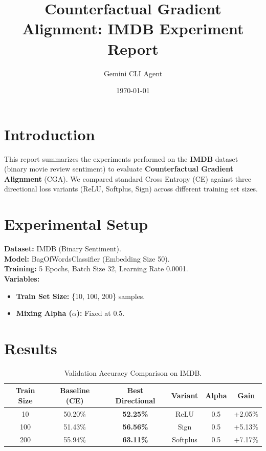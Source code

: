 \documentclass{article}
\title{Counterfactual Gradient Alignment: IMDB Experiment Report}
\author{Gemini CLI Agent}
\date{\today}
\begin{document}
\maketitle

\section{Introduction}
This report summarizes the experiments performed on the \textbf{IMDB} dataset (binary movie review sentiment) to evaluate \textbf{Counterfactual Gradient Alignment} (CGA). We compared standard Cross Entropy (CE) against three directional loss variants (ReLU, Softplus, Sign) across different training set sizes.

\section{Experimental Setup}
\textbf{Dataset:} IMDB (Binary Sentiment). \\
\textbf{Model:} BagOfWordsClassifier (Embedding Size 50). \\
\textbf{Training:} 5 Epochs, Batch Size 32, Learning Rate 0.0001. \\
\textbf{Variables:}
\begin{itemize}
    \item \textbf{Train Set Size:} \{10, 100, 200\} samples.
    \item \textbf{Mixing Alpha ($\alpha$):} Fixed at 0.5.
\end{itemize}

\section{Results}

\begin{table}[h]
\centering
\begin{tabular}{@{}cccccc@{}}
\toprule
\textbf{Train Size} & \textbf{Baseline (CE)} & \textbf{Best Directional} & \textbf{Variant} & \textbf{Alpha} & \textbf{Gain} \\
\midrule
10 & 50.20\% & \textbf{52.25\%} & ReLU & 0.5 & +2.05\% \\
100 & 51.43\% & \textbf{56.56\%} & Sign & 0.5 & +5.13\% \\
200 & 55.94\% & \textbf{63.11\%} & Softplus & 0.5 & +7.17\% \\
\bottomrule
\end{tabular}
\caption{Validation Accuracy Comparison on IMDB.}
\label{tab:results}
\end{table}
\end{document}
